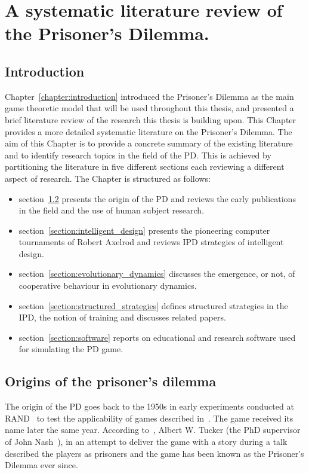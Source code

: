 \chapter{A systematic literature review of the Prisoner's Dilemma.}\label{chapter:literature_review}

\section{Introduction}

Chapter~\ref{chapter:introduction} introduced the Prisoner's Dilemma as the main
game theoretic model that will be used throughout this thesis, and presented a
brief literature review of the research this thesis is building upon. This
Chapter provides a more detailed systematic literature on the Prisoner's
Dilemma. The aim of this Chapter is to provide a concrete summary of the
existing literature and to identify research topics in the field of the PD. This is
achieved by partitioning the literature in five different sections each
reviewing a different aspect of research. The Chapter is structured as follows:

\begin{itemize}
    \item section~\ref{section:origin} presents the origin of the PD
    and reviews the early publications in the field and the use of
    human subject research.
    \item section~\ref{section:intelligent_design} presents the pioneering computer
    tournaments of Robert Axelrod and reviews IPD strategies of intelligent design.
    \item section~\ref{section:evolutionary_dynamics} discusses
    the emergence, or not, of cooperative behaviour in evolutionary dynamics.
    \item section~\ref{section:structured_strategies} defines structured
    strategies in the IPD, the notion of training and discusses related papers.
    \item section~\ref{section:software} reports on educational and research software
    used for simulating the PD game.
\end{itemize}

\section{Origins of the prisoner's dilemma}\label{section:origin}

The origin of the PD goes back to the 1950s in early experiments conducted at
RAND~\cite{Flood1958} to test the applicability of games described
in~\cite{VonNeumann1944}. The game received its name later the same year.
According to~\cite{Tucker1983}, Albert W. Tucker (the PhD supervisor of John
Nash~\cite{Nash1951}), in an attempt to deliver the game with a story during a
talk described the players as prisoners and the game has been known as the
Prisoner's Dilemma ever since.

